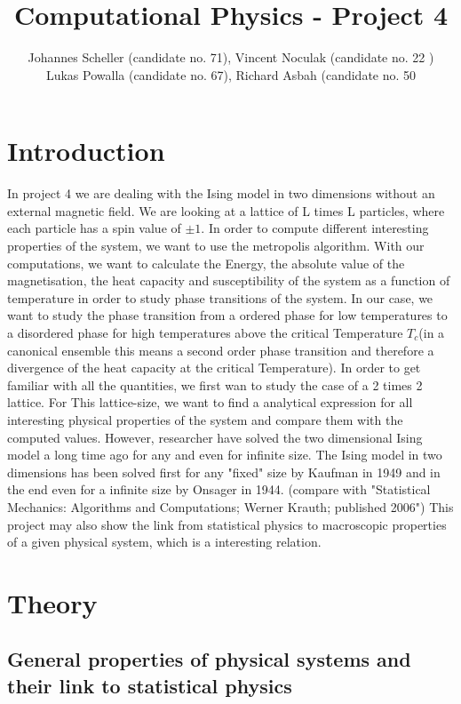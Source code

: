 \documentclass[10pt,a4paper]{article}
\author{Johannes Scheller (candidate no. 71), Vincent Noculak (candidate no. 22 )\\ Lukas Powalla (candidate no. 67), Richard Asbah (candidate no. 50 }
\title{Computational Physics - Project 4}
\begin{document}
\maketitle
\newpage
\tableofcontents
\newpage

\section*{Introduction}
In project 4 we are dealing with the Ising model in two dimensions without an external magnetic field. We are looking at a lattice of L times L particles, where each particle has a spin value of $\pm 1$. In order to compute different interesting properties of the system, we want to use the metropolis algorithm.  With our computations, we want to calculate the Energy, the absolute value of the magnetisation, the heat capacity and susceptibility of the system as a function of temperature in order to study phase transitions of the system. 
In our case, we want to study the phase transition from a ordered phase for low temperatures to a disordered phase for high temperatures above the critical Temperature $T_c$(in a canonical ensemble this means a second order phase transition and therefore a divergence of the heat capacity at the critical Temperature).
In order to get familiar with all the quantities, we first wan to study the case of a 2 times 2 lattice. For This lattice-size, we want to find a analytical expression for all interesting physical properties of the system and compare them with the computed values.
However, researcher have solved the two dimensional Ising model a long time ago for any and even for infinite size.
The Ising model in two dimensions has been solved first for any "fixed" size by Kaufman in 1949 and in the end even for a infinite size by Onsager in 1944.  (compare with "Statistical Mechanics: Algorithms and Computations; Werner Krauth; published 2006")
This project may also show the link from statistical physics to macroscopic properties of a given physical system, which is a interesting relation.
\section{Theory}

\subsection{General properties of physical systems and their link to statistical physics}
\end{document}
